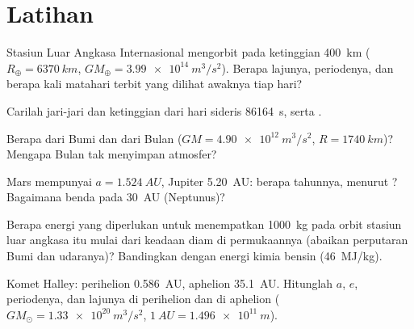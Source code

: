 \section{Latihan}

\begin{exercise}[$\star$]\label{exo:b1:central-forces:1}
Stasiun Luar Angkasa Internasional mengorbit pada ketinggian
\qty{400}{km} ($R_\oplus = \qty{6370}{km}$, $GM_\oplus = \qty{3.99e14}{m^3/s^2}$).
Berapa lajunya, periodenya, dan berapa kali matahari terbit yang
dilihat awaknya tiap hari?
\end{exercise}

\begin{exercise}[$\star$]\label{exo:b1:central-forces:2}
Carilah jari-jari dan ketinggian  dari hari sideris
\qty{86164}{s}, serta .
\end{exercise}

\begin{exercise}[$\star$]\label{exo:b1:central-forces:3}
Berapa  dari Bumi dan dari Bulan ($GM = \qty{4.90e12}{m^3/s^2}$,
$R = \qty{1740}{km}$)? Mengapa Bulan tak menyimpan atmosfer?
\end{exercise}

\begin{exercise}[$\star$]\label{exo:b1:central-forces:4}
Mars mempunyai $a = \qty{1.524}{AU}$, Jupiter \qty{5.20}{AU}: berapa
tahunnya, menurut ? Bagaimana benda pada \qty{30}{AU} (Neptunus)?
\end{exercise}

\begin{exercise}[$\star\star$]\label{exo:b1:central-forces:5}
Berapa energi yang diperlukan untuk menempatkan \qty{1000}{kg} pada
orbit stasiun luar angkasa itu mulai dari keadaan diam di permukaannya
(abaikan perputaran Bumi dan udaranya)? Bandingkan dengan energi kimia bensin (\qty{46}{MJ/kg}).
\end{exercise}

\begin{exercise}[$\star\star$]\label{exo:b1:central-forces:6}
Komet Halley: perihelion \qty{0.586}{AU}, aphelion \qty{35.1}{AU}.
Hitunglah $a$, $e$, periodenya, dan lajunya di perihelion dan di
aphelion ($GM_\odot = \qty{1.33e20}{m^3/s^2}$, $\qty{1}{AU} = \qty{1.496e11}{m}$).
\end{exercise}

